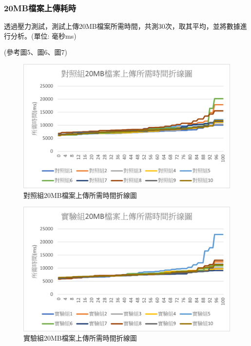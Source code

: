 \documentclass[11pt,twocolumn]{article}
\begin{document}
\subsubsection{20MB檔案上傳耗時}
透過壓力測試，測試上傳20MB檔案所需時間，共測30次，取其平均，並將數據進行分析。(單位: 毫秒ms)\par
(參考圖5、圖6、圖7)
\begin{figure}[h]
\centering
\includegraphics[scale=0.55]{對照組20MB檔案上傳所需時間折線圖.png}
\caption{對照組20MB檔案上傳所需時間折線圖}
\end{figure}

\begin{figure}[h]
\centering
\includegraphics[scale=0.55]{實驗組20MB檔案上傳所需時間折線圖.png}
\caption{實驗組20MB檔案上傳所需時間折線圖}
\end{figure}
\end{document}
